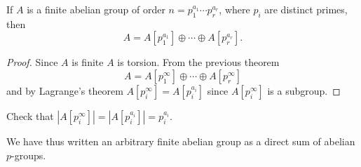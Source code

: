 \begin{corol}
If $A$ is a finite abelian group of order $n = p_1^{a_1} \cdots
p_r^{a_r}$, where $p_i$ are distinct primes, then
$$
A = A[p_1^{a_1}] \oplus \cdots \oplus A[p_r^{a_r}].
$$
\end{corol}
\begin{proof}
Since $A$ is finite $A$ is torsion. From the previous theorem
$$
A = A[p_1^\infty] \oplus \cdots \oplus A[p_r^{\infty}]
$$
and by Lagrange's theorem $A[p_i^\infty] = A[p_i^{a_i}]$ since
$A[p_i^\infty]$ is a subgroup.
\end{proof}

\begin{exer}
Check that
$|A[p_i^\infty]| = |A[p_i^{a_i}]| = p_i^{a_i}$.
\end{exer}

We have thus written an arbitrary finite abelian group as a direct sum
of abelian $p$-groups.


